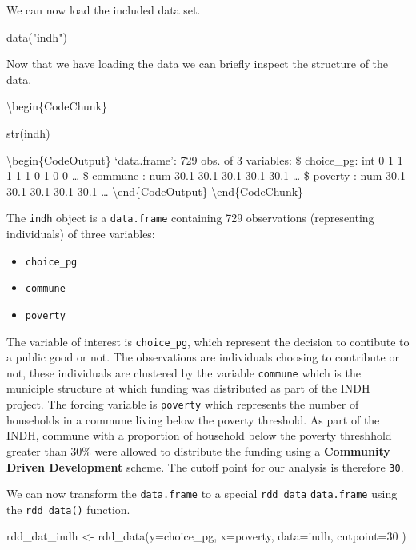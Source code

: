 \documentclass[article]{jss}
\begin{document}
We can now load the included data set.

\begin{CodeChunk}
\begin{CodeInput}
data("indh")
\end{CodeInput}
\end{CodeChunk}

Now that we have loading the data we can briefly inspect the structure
of the data.

\textbackslash{}begin\{CodeChunk\}

\begin{CodeInput}
str(indh)
\end{CodeInput}

\textbackslash{}begin\{CodeOutput\} `data.frame': 729 obs. of 3
variables: \$ choice\_pg: int 0 1 1 1 1 1 0 1 0 0 \ldots{} \$ commune :
num 30.1 30.1 30.1 30.1 30.1 \ldots{} \$ poverty : num 30.1 30.1 30.1
30.1 30.1 \ldots{} \textbackslash{}end\{CodeOutput\}
\textbackslash{}end\{CodeChunk\}

The \texttt{indh} object is a \texttt{data.frame} containing 729
observations (representing individuals) of three variables:

\begin{itemize}
\itemsep1pt\parskip0pt
\item
  \texttt{choice\_pg}
\item
  \texttt{commune}
\item
  \texttt{poverty}
\end{itemize}

The variable of interest is \texttt{choice\_pg}, which represent the
decision to contibute to a public good or not. The observations are
individuals choosing to contribute or not, these individuals are
clustered by the variable \texttt{commune} which is the municiple
structure at which funding was distributed as part of the INDH project.
The forcing variable is \texttt{poverty} which represents the number of
households in a commune living below the poverty threshold. As part of
the INDH, commune with a proportion of household below the poverty
threshhold greater than 30\% were allowed to distribute the funding
using a \textbf{Community Driven Development} scheme. The cutoff point
for our analysis is therefore \texttt{30}.

We can now transform the \texttt{data.frame} to a special
\texttt{rdd\_data} \texttt{data.frame} using the \texttt{rdd\_data()}
function.

\begin{CodeChunk}
\begin{CodeInput}
rdd_dat_indh <- rdd_data(y=choice_pg,
                         x=poverty,
                         data=indh,
                         cutpoint=30 )
\end{CodeInput}
\end{CodeChunk}
\end{document}
